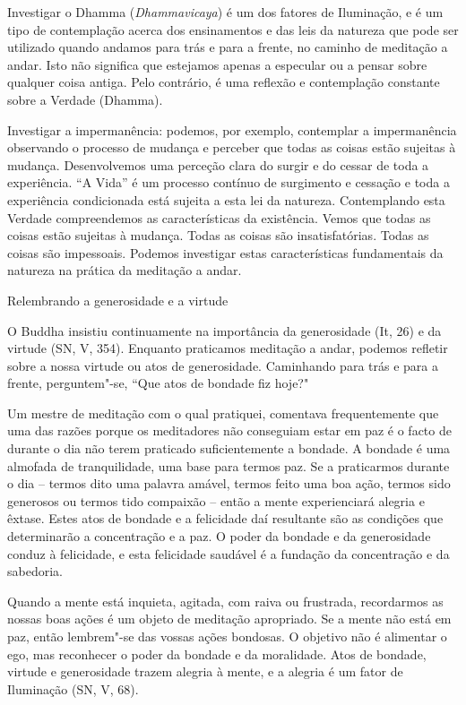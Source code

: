 Investigar o Dhamma (\emph{Dhammavicaya}) é um dos fatores de
Iluminação, e é um tipo de contemplação acerca dos ensinamentos e das
leis da natureza que pode ser utilizado quando andamos para trás e para
a frente, no caminho de meditação a andar. Isto não significa que
estejamos apenas a especular ou a pensar sobre qualquer coisa antiga.
Pelo contrário, é uma reflexão e contemplação constante sobre a Verdade
(Dhamma).

Investigar a impermanência: podemos, por exemplo, contemplar a
impermanência observando o processo de mudança e perceber que todas as
coisas estão sujeitas à mudança. Desenvolvemos uma perceção clara do
surgir e do cessar de toda a experiência. ``A Vida'' é um processo
contínuo de surgimento e cessação e toda a experiência condicionada está
sujeita a esta lei da natureza. Contemplando esta Verdade compreendemos
as características da existência. Vemos que todas as coisas estão
sujeitas à mudança. Todas as coisas são insatisfatórias. Todas as coisas
são impessoais. Podemos investigar estas características fundamentais da
natureza na prática da meditação a andar.

\begin{siderule-quote}
  Relembrando a generosidade e a virtude
\end{siderule-quote}

O Buddha insistiu continuamente na importância da generosidade (It, 26)
e da virtude (SN, V, 354). Enquanto praticamos meditação a andar,
podemos refletir sobre a nossa virtude ou atos de generosidade.
Caminhando para trás e para a frente, perguntem"-se, ``Que atos de bondade
fiz hoje?"

Um mestre de meditação com o qual pratiquei, comentava frequentemente
que uma das razões porque os meditadores não conseguiam estar em paz é o
facto de durante o dia não terem praticado suficientemente a bondade. A
bondade é uma almofada de tranquilidade, uma base para termos paz. Se a
praticarmos durante o dia -- termos dito uma palavra amável, termos
feito uma boa ação, termos sido generosos ou termos tido compaixão --
então a mente experienciará alegria e êxtase. Estes atos de bondade e a
felicidade daí resultante são as condições que determinarão a
concentração e a paz. O poder da bondade e da generosidade conduz à
felicidade, e esta felicidade saudável é a fundação da concentração e da
sabedoria.

Quando a mente está inquieta, agitada, com raiva ou frustrada,
recordarmos as nossas boas ações é um objeto de meditação apropriado. Se
a mente não está em paz, então lembrem"-se das vossas ações bondosas. O
objetivo não é alimentar o ego, mas reconhecer o poder da bondade e da
moralidade. Atos de bondade, virtude e generosidade trazem alegria à
mente, e a alegria é um fator de Iluminação (SN, V, 68).

